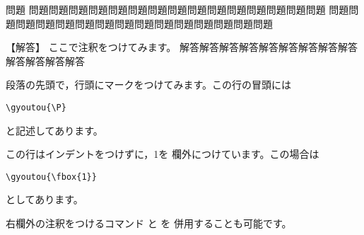 \begin{itembox}{問題}
問題問題問題問題問題問題問題問題問題問題問題問題問題問題問題
問題問題問題問題問題問題問題問題問題問題問題問題問題問題問題
\end{itembox}
\begin{tyuukai}
【解答】
ここで注釈をつけてみます。
解答解答解答解答解答解答解答解答解答解答解答解答解答

\gyoutou{\P}
段落の先頭で，行頭にマークをつけてみます。この行の冒頭には
\begin{jquote}
\begin{verbatim}
\gyoutou{\P}
\end{verbatim}
\end{jquote}
と記述してあります。

\noindent{}この行はインデントをつけずに，\fbox1を
欄外につけています。この場合は
\begin{jquote}
\begin{verbatim}
\gyoutou{\fbox{1}}
\end{verbatim}
\end{jquote}
としてあります。

右欄外の注釈をつけるコマンド  と  を
併用することも可能です。
\end{tyuukai}
